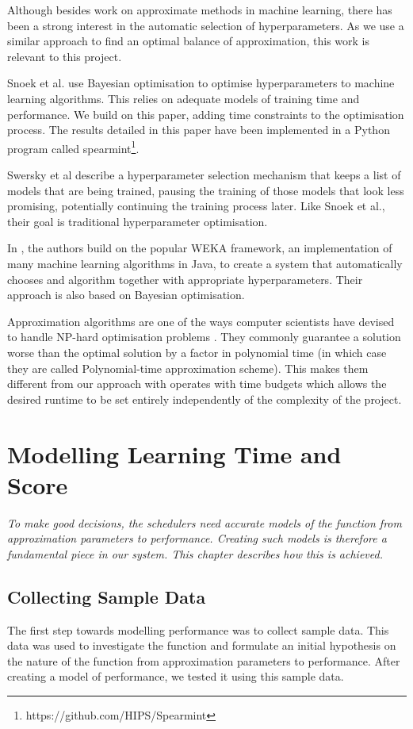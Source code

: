 \documentclass[a4paper,12pt,twoside,openright]{report}
\begin{document}
Although besides work on approximate methods in machine learning, there has been a strong interest in the automatic selection of hyperparameters. As we use a similar approach to find an optimal balance of approximation, this work is relevant to this project.

Snoek et al. \cite{PracticalBayesianOptimization} use Bayesian optimisation to optimise hyperparameters to machine learning algorithms. This relies on adequate models of training time and performance. We build on this paper, adding time constraints to the optimisation process. The results detailed in this paper have been implemented in a Python program called spearmint\footnote{https://github.com/HIPS/Spearmint}.

Swersky et al \cite{2014arXiv1406.3896S} describe a hyperparameter selection mechanism that keeps a list of models that are being trained, pausing the training of those models that look less promising, potentially continuing the training process later. Like Snoek et al., their goal is traditional hyperparameter optimisation.

In \cite{ThoHutHooLey13-AutoWEKA}, the authors build on the popular WEKA framework, an implementation of many machine learning algorithms in Java, to create a system that automatically chooses and algorithm together with appropriate hyperparameters. Their approach is also based on Bayesian optimisation.

Approximation algorithms are one of the ways computer scientists have devised to handle NP-hard optimisation problems \cite{Vazirani:2001:AA:500776}. They commonly guarantee a solution worse than the optimal solution by a factor in polynomial time (in which case they are called Polynomial-time approximation scheme). This makes them different from our approach with operates with time budgets which allows the desired runtime to be set entirely independently of the complexity of the project.




\chapter{Modelling Learning Time and Score}
\label{ch:modelling}
\textit{To make good decisions, the schedulers need accurate models of the function from approximation parameters to performance. Creating such models is therefore a fundamental piece in our system. This chapter describes how this is achieved.}

\section{Collecting Sample Data}
The first step towards modelling performance was to collect sample data. This data was used to investigate the function and formulate an initial hypothesis on the nature of the function from approximation parameters to performance. After creating a model of performance, we tested it using this sample data.
\end{document}
